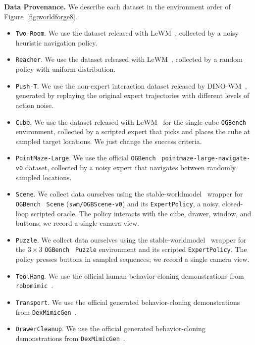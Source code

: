 \documentclass{article} %
\newcommand{\methodname}[1]{\textup{#1}}
\newcommand{\dataset}[1]{\texttt{#1}}
\newcommand{\lead}[1]{\textbf{#1}}
\begin{document}
\lead{Data Provenance.}
We describe each dataset in the environment order of Figure~\ref{fig:worldforge8}.
\begin{itemize}
    \item \dataset{Two-Room}. We use the dataset released with
    \methodname{LeWM}~\citep{maes2026lewm}, collected by a noisy heuristic
    navigation policy.
    \item \dataset{Reacher}. We use the dataset released with
    \methodname{LeWM}~\citep{maes2026lewm}, collected by a random policy with uniform distribution.
    \item \dataset{Push-T}. We use the non-expert interaction dataset released by
    \methodname{DINO-WM}~\citep{zhou2024dinowm}, generated by replaying the original
    expert trajectories with different levels of action noise.
    \item \dataset{Cube}. We use the dataset released with
    \methodname{LeWM}~\citep{maes2026lewm} for the single-cube
    \dataset{OGBench}~\citep{park2025ogbench} environment, collected by a scripted
    expert that picks and places the cube at sampled target locations. We just change the success criteria.
    \item \dataset{PointMaze-Large}. We use the official
   \dataset{OGBench}~\citep{park2025ogbench} \texttt{pointmaze-large-navigate-v0}
    dataset, collected by a noisy expert that navigates between randomly sampled
    locations. 
    \item \dataset{Scene}. We collect data ourselves using the
    \methodname{stable-worldmodel}~\citep{maes2026swm} wrapper for
    \dataset{OGBench}~\citep{park2025ogbench} \dataset{Scene}
    (\texttt{swm/OGBScene-v0}) and its \texttt{ExpertPolicy}, a noisy, closed-loop
    scripted oracle. The policy interacts with the cube, drawer, window, and
    buttons; we record a single camera view.
    \item \dataset{Puzzle}. We collect data ourselves using the
    \methodname{stable-worldmodel}~\citep{maes2026swm} wrapper for the
    $3\times3$ \dataset{OGBench}~\citep{park2025ogbench} \dataset{Puzzle}
    environment and its scripted \texttt{ExpertPolicy}. The policy presses
    buttons in sampled sequences; we record a single camera view.
    \item \dataset{ToolHang}. We use the official human behavior-cloning
    demonstrations from \dataset{robomimic}~\citep{mandlekar2022robomimic}.
    \item \dataset{Transport}. We use the official generated behavior-cloning
    demonstrations from \dataset{DexMimicGen}~\citep{jiang2025dexmimicgen}.
    \item \dataset{DrawerCleanup}. We use the official generated behavior-cloning
    demonstrations from \dataset{DexMimicGen}~\citep{jiang2025dexmimicgen}.
\end{itemize}
\end{document}
